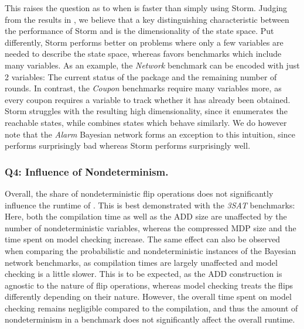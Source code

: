 	This raises the question as to when \NDICE is faster than simply using Storm.
	Judging from the results in , we believe that a key distinguishing characteristic between the performance of Storm and \NDICE is the dimensionality of the state space.
	Put differently, Storm performs better on problems where only a few variables are needed to describe the state space, whereas \NDICE favors benchmarks which include many variables.
	As an example, the \textit{Network} benchmark can be encoded with just 2 variables: The current status of the package and the remaining number of rounds. 
	In contrast, the \textit{Coupon} benchmarks require many variables more, as every coupon requires a variable to track whether it has already been obtained.
	Storm struggles with the resulting high dimensionality, since it enumerates the reachable states, while \NDICE combines states which behave similarly.
	We do however note that the \textit{Alarm} Bayesian network forms an exception to this intuition, since \NDICE performs surprisingly bad whereas Storm performs surprisingly well.


\subsubsection*{Q4: Influence of Nondeterminism.}
Overall, the share of nondeterministic flip operations does not significantly influence the runtime of \NDICE.
This is best demonstrated with the \textit{3SAT} benchmarks:
Here, both the compilation time as well as the ADD size are unaffected by the number of nondeterministic variables, whereas the compressed MDP size and the time spent on model checking increase.
The same effect can also be observed when comparing the probabilistic and nondeterministic instances of the Bayesian network benchmarks, as compilation times are largely unaffected and model checking is a little slower.
This is to be expected, as the ADD construction is agnostic to the nature of flip operations, whereas model checking treats the flips differently depending on their nature.
However, the overall time spent on model checking remains negligible compared to the compilation, and thus the amount of nondeterminism in a benchmark does not significantly affect the overall runtime.


\medskip



